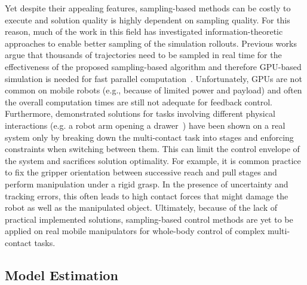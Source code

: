 Yet despite their appealing features, sampling-based methods can be costly to execute and solution quality is highly dependent on sampling quality. For this reason, much of the work in this field has investigated information-theoretic approaches to enable better sampling of the simulation rollouts. Previous works argue that thousands of trajectories need to be sampled in real time for the effectiveness of the proposed sampling-based algorithm and therefore GPU-based simulation is needed for fast parallel computation~\cite{williams_model_2017}. 
Unfortunately, GPUs are not common on mobile robots (e.g., because of limited power and payload) and often the overall computation times are still not adequate for feedback control. 
Furthermore, demonstrated solutions for tasks involving different physical interactions (e.g. a robot arm opening a drawer~\cite{abraham_model-based_2020}) have been shown on a real system only by breaking down the multi-contact task into stages and enforcing constraints when switching between them. 
This can limit the control envelope of the system and sacrifices solution optimality. For example, it is common practice to fix the gripper orientation between successive reach and pull stages and perform manipulation under a rigid grasp. In the presence of uncertainty and tracking errors, this often leads to high contact forces that might damage the robot as well as the manipulated object.
Ultimately, because of the lack of practical implemented solutions, sampling-based control methods are yet to be applied on real mobile manipulators for whole-body control of complex multi-contact tasks.

\subsection{Model Estimation}

